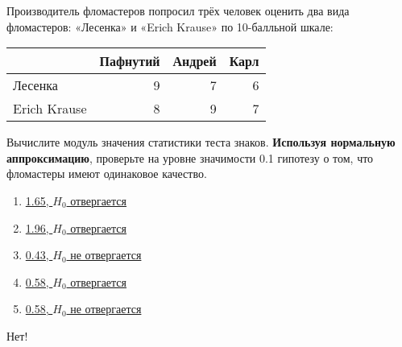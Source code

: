 \documentclass[t]{beamer}
\begin{document}
 \begin{frame} \label{25-No} 
\begin{block}{25} 

  Производитель фломастеров попросил трёх человек оценить два вида фломастеров: «Лесенка» и «Erich Krause» по 10-балльной шкале:

\begin{center}
\begin{tabular}{lrrr} \toprule
 & Пафнутий  & Андрей & Карл \\
\midrule
Лесенка & 9 & 7 & 6 \\
Erich Krause & 8 & 9 & 7 \\
\bottomrule
\end{tabular}
\end{center}

Вычислите модуль значения статистики теста знаков. \textbf{Используя нормальную аппроксимацию}, проверьте на уровне значимости 0.1 гипотезу о том, что фломастеры имеют одинаковое качество.

  


 \end{block} 
\begin{enumerate} 
\item[] \hyperlink{25-No}{\beamergotobutton{} 1.65, $H_0$ отвергается}
\item[] \hyperlink{25-No}{\beamergotobutton{} 1.96, $H_0$ отвергается}
\item[] \hyperlink{25-No}{\beamergotobutton{} 0.43, $H_0$ не отвергается}
\item[] \hyperlink{25-No}{\beamergotobutton{} 0.58, $H_0$ отвергается}
\item[] \hyperlink{25-Yes}{\beamergotobutton{} 0.58, $H_0$ не отвергается}
\end{enumerate} 

 \alert{Нет!} 
\end{frame} 
\end{document}

